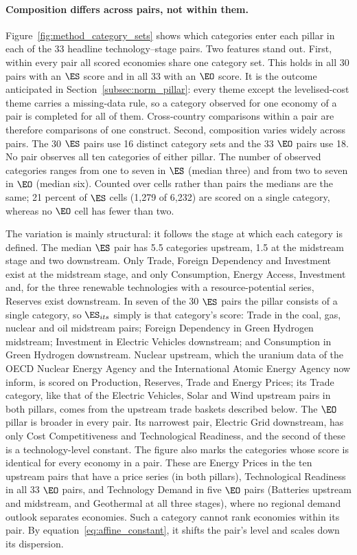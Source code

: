 

\paragraph{Composition differs across pairs, not within them.}
Figure~\ref{fig:method_category_sets} shows which categories enter each pillar in each of the 33
headline technology--stage pairs. Two features stand out. First, within every pair all scored
economies share one category set. This holds in all 30 pairs with an $\ES$ score and in all 33
with an $\EO$ score. It is the outcome anticipated in Section~\ref{subsec:norm_pillar}: every
theme except the levelised-cost theme carries a missing-data rule, so a category observed for
one economy of a pair is completed for all of them. Cross-country comparisons within a pair are
therefore comparisons of one construct. Second, composition varies widely across pairs. The 30
$\ES$ pairs use 16 distinct category sets and the 33 $\EO$ pairs use 18. No pair observes all ten
categories of either pillar. The number of observed categories ranges from one to seven in $\ES$
(median three) and from two to seven in $\EO$ (median six). Counted over cells rather than pairs
the medians are the same; 21 percent of $\ES$ cells (1,279 of 6,232) are scored on a single
category, whereas no $\EO$ cell has fewer than two.

The variation is mainly structural: it follows the stage at which each category is defined. The
median $\ES$ pair has 5.5 categories upstream, 1.5 at the midstream stage and two downstream.
Only Trade, Foreign Dependency and Investment exist at the midstream stage, and only Consumption,
Energy Access, Investment and, for the three renewable technologies with a resource-potential
series, Reserves exist downstream. In seven of the 30 $\ES$ pairs the pillar consists of a single
category, so $\ES_{its}$ simply is that category's score: Trade in the coal, gas, nuclear and oil
midstream pairs; Foreign Dependency in Green Hydrogen midstream; Investment in Electric Vehicles
downstream; and Consumption in Green Hydrogen downstream. Nuclear upstream, which the uranium
data of the OECD Nuclear Energy Agency and the International Atomic Energy Agency now inform, is
scored on Production, Reserves, Trade and Energy Prices; its Trade category, like that of the
Electric Vehicles, Solar and Wind upstream pairs in both pillars, comes from the upstream trade
baskets described below. The $\EO$ pillar is broader in every pair. Its
narrowest pair, Electric Grid downstream, has only Cost Competitiveness and Technological
Readiness, and the second of these is a technology-level constant. The figure also marks the
categories whose score is identical for every economy in a pair. These are Energy Prices in the
ten upstream pairs that have a price series (in both pillars), Technological Readiness in all 33
$\EO$ pairs, and Technology Demand in five $\EO$ pairs (Batteries upstream and midstream, and
Geothermal at all three stages), where no regional demand outlook separates economies. Such a
category cannot rank economies within its pair. By equation~\eqref{eq:affine_constant}, it shifts
the pair's level and scales down its dispersion.

